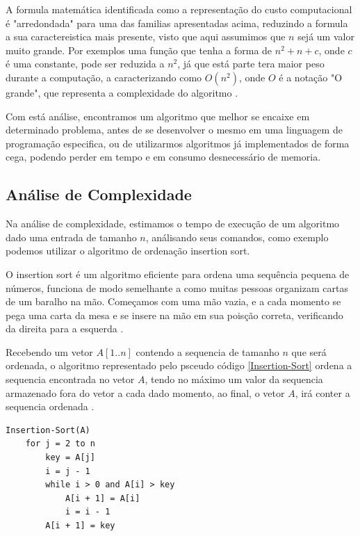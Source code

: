 \documentclass[
	12pt,				%
	openright,			%
	oneside,			%
	a4paper,			%
	english,			%
	brazil				%
	]{abntex2}
\begin{document}
A formula matemática identificada como a representação do custo computacional é "arredondada" para uma das familias
apresentadas acima, reduzindo a formula a sua caractereistica mais presente, visto que aqui assumimos que $n$ sejá
um valor muito grande. Por exemplos uma função que tenha a forma de $n^2 + n + c$, onde $c$ é uma constante, 
pode ser reduzida a $n^2$, já que está parte tera maior peso durante a computação, a caracterizando 
como $O(n^2)$, onde $O$ é a notação "O grande", que representa a complexidade do algoritmo \cite{introductionAlgorthms}.

Com está análise, encontramos um algoritmo que melhor se encaixe em determinado problema, antes de se
desenvolver o mesmo em uma linguagem de programação especifica, ou de utilizarmos algoritmos já implementados de forma
cega, podendo perder em tempo e em consumo desnecessário de memoria.

\subsection{Análise de Complexidade}

Na análise de complexidade, estimamos o tempo de execução de um algoritmo dado uma entrada de tamanho $n$, análisando 
seus comandos, como exemplo podemos utilizar o algoritmo de ordenação insertion sort. 

O insertion sort é um algoritmo eficiente para ordena uma sequência pequena de números, funciona de modo semelhante a
como muitas pessoas organizam cartas de um baralho na mão. Começamos com uma mão vazia, e a cada momento se pega uma
carta da mesa e se insere na mão em sua poisção correta, verificando da direita para a esquerda \cite{introductionAlgorthms}.

Recebendo um vetor $A[1..n]$ contendo a sequencia de tamanho $n$ que será ordenada,  o algoritmo representado pelo
psceudo código \ref{Insertion-Sort} ordena a sequencia encontrada no vetor $A$, tendo no máximo um valor da sequencia 
armazenado fora do vetor a cada dado momento, ao final, o vetor $A$, irá conter a sequencia ordenada \cite{introductionAlgorthms}.

\lstset{style=psceudo}
\begin{lstlisting}[caption={\label{Insertion-Sort}Insertion-Sort}]
	Insertion-Sort(A)
	for j = 2 to n
		key = A[j]
		i = j - 1
		while i > 0 and A[i] > key
			A[i + 1] = A[i]
			i = i - 1
		A[i + 1] = key	
\end{lstlisting}
\end{document}
